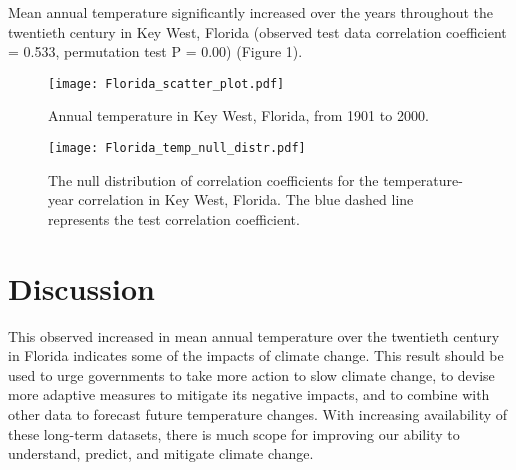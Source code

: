 \documentclass{article}
\begin{document}
    Mean annual temperature significantly increased over the years throughout the twentieth century in Key West, Florida (observed test data correlation coefficient = 0.533, permutation test P = 0.00) (Figure 1). \vspace{-0.5em}

    \begin{figure}[htbp]
    \centering
    \begin{minipage}{.5\textwidth}
        \centering
        \texttt{[image: Florida\_scatter\_plot.pdf]}
        \caption{Annual temperature in Key West, Florida, \newline from 1901 to 2000.}
        \label{fig.test1}
    \end{minipage}%
    \begin{minipage}{.5\textwidth}
        \centering
        \texttt{[image: Florida\_temp\_null\_distr.pdf]}
        \caption{The null distribution of correlation coefficients for the temperature-year correlation in Key West, Florida. The blue dashed line represents the test correlation coefficient.}
        \label{fig:test2}
    \end{minipage}
    \end{figure}\vspace{-1.5em}

\section{Discussion \vspace{-0.5em}}

    This observed increased in mean annual temperature over the twentieth century in Florida indicates some of the impacts of climate change. This result should be used to urge governments to take more action to slow climate change, to devise more adaptive measures to mitigate its negative impacts, and to combine with other data to forecast future temperature changes. With increasing availability of these long-term datasets, there is much scope for improving our ability to understand, predict, and mitigate climate change. \vspace{-1em}

\printbibliography
\end{document}
